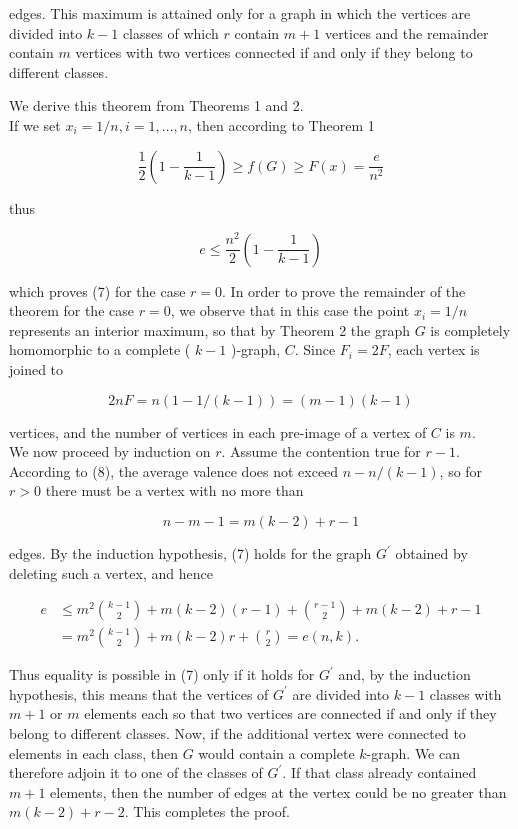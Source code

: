 \documentclass[10pt]{article}
\begin{document}
edges. This maximum is attained only for a graph in which the vertices are divided into \(k-1\) classes of which \(r\) contain \(m+1\) vertices and the remainder contain \(m\) vertices with two vertices connected if and only if they belong to different classes.

We derive this theorem from Theorems 1 and 2.\\
If we set \(x_{i}=1 / n, i=1, \ldots, n\), then according to Theorem 1

\[
\frac{1}{2}\left(1-\frac{1}{k-1}\right) \geqslant f(G) \geqslant F(x)=\frac{e}{n^{2}}
\]

thus

\[
e \leqslant \frac{n^{2}}{2}\left(1-\frac{1}{k-1}\right)
\]

which proves (7) for the case \(r=0\). In order to prove the remainder of the theorem for the case \(r=0\), we observe that in this case the point \(x_{i}=1 / n\) represents an interior maximum, so that by Theorem 2 the graph \(G\) is completely homomorphic to a complete ( \(k-1\) )-graph, \(C\). Since \(F_{i}=2 F\), each vertex is joined to

\[
2 n F=n(1-1 /(k-1))=(m-1)(k-1)
\]

vertices, and the number of vertices in each pre-image of a vertex of \(C\) is \(m\).\\
We now proceed by induction on \(r\). Assume the contention true for \(r-1\). According to (8), the average valence does not exceed \(n-n /(k-1)\), so for \(r>0\) there must be a vertex with no more than

\[
n-m-1=m(k-2)+r-1
\]

edges. By the induction hypothesis, (7) holds for the graph \(G^{\prime}\) obtained by deleting such a vertex, and hence

\[
\begin{aligned}
e & \leqslant m^{2}\binom{k-1}{2}+m(k-2)(r-1)+\binom{r-1}{2}+m(k-2)+r-1 \\
& =m^{2}\binom{k-1}{2}+m(k-2) r+\binom{r}{2}=e(n, k) .
\end{aligned}
\]

Thus equality is possible in (7) only if it holds for \(G^{\prime}\) and, by the induction hypothesis, this means that the vertices of \(G^{\prime}\) are divided into \(k-1\) classes with \(m+1\) or \(m\) elements each so that two vertices are connected if and only if they belong to different classes. Now, if the additional vertex were connected to elements in each class, then \(G\) would contain a complete \(k\)-graph. We can therefore adjoin it to one of the classes of \(G^{\prime}\). If that class already contained \(m+1\) elements, then the number of edges at the vertex could be no greater than \(m(k-2)+r-2\). This completes the proof.
\end{document}
